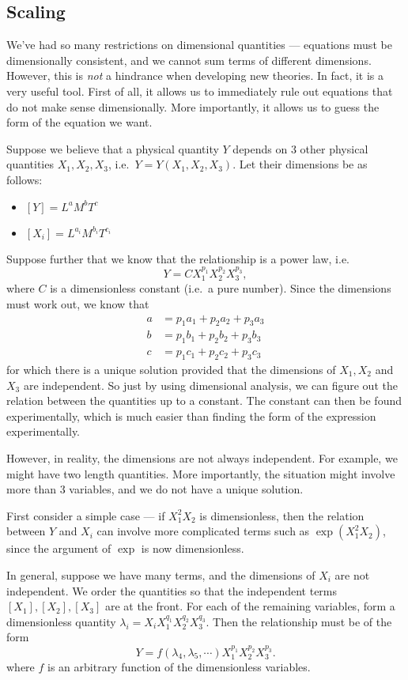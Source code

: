 \documentclass[a4paper]{article}
\begin{document}
\subsection{Scaling}
We've had so many restrictions on dimensional quantities --- equations must be dimensionally consistent, and we cannot sum terms of different dimensions. However, this is \emph{not} a hindrance when developing new theories. In fact, it is a very useful tool. First of all, it allows us to immediately rule out equations that do not make sense dimensionally. More importantly, it allows us to guess the form of the equation we want.

Suppose we believe that a physical quantity $Y$ depends on $3$ other physical quantities $X_1, X_2, X_3$, i.e.\ $Y = Y(X_1, X_2, X_3)$. Let their dimensions be as follows:
\begin{itemize}
  \item $[Y] = L^aM^bT^c$
  \item $[X_i] = L^{a_i}M^{b_i}T^{c_i}$
\end{itemize}
Suppose further that we know that the relationship is a power law, i.e.
\[
  Y = CX_1^{p_1}X_2^{p_2}X_3^{p_3},
\]
where $C$ is a dimensionless constant (i.e.\ a pure number). Since the dimensions must work out, we know that
\begin{align*}
  a &= p_1a_1 + p_2a_2 + p_3a_3\\
  b &= p_1b_1 + p_2b_2 + p_3b_3\\
  c &= p_1c_1 + p_2c_2 + p_3c_3
\end{align*}
for which there is a unique solution provided that the dimensions of $X_1, X_2$ and $X_3$ are independent. So just by using dimensional analysis, we can figure out the relation between the quantities up to a constant. The constant can then be found experimentally, which is much easier than finding the form of the expression experimentally.

However, in reality, the dimensions are not always independent. For example, we might have two length quantities. More importantly, the situation might involve more than 3 variables, and we do not have a unique solution.

First consider a simple case --- if $X_1^2 X_2$ is dimensionless, then the relation between $Y$ and $X_i$ can involve more complicated terms such as $\exp (X_1^2 X_2)$, since the argument of $\exp$ is now dimensionless.

In general, suppose we have many terms, and the dimensions of $X_i$ are not independent. We order the quantities so that the independent terms $[X_1], [X_2], [X_3]$ are at the front. For each of the remaining variables, form a dimensionless quantity $\lambda_i = X_iX_1^{q_1}X_2^{q_2}X_3^{q_3}$. Then the relationship must be of the form
\[
  Y = f(\lambda_4, \lambda_5, \cdots) X_1^{p_1}X_2^{p_2}X_3^{p_3}.
\]
where $f$ is an arbitrary function of the dimensionless variables.
\end{document}
